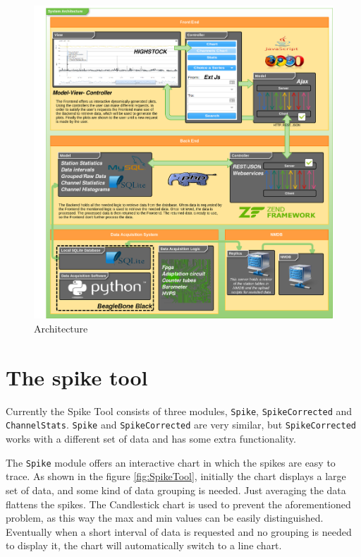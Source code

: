 \documentclass[a4paper]{jpconf}
\begin{document}
\begin{figure}[h]
    \centering
    \includegraphics[keepaspectratio, width=1\textwidth]{./resources/Architecture.png}
    \caption{Architecture}
    \label{fig:arch}
\end{figure}

\section{The spike tool}

Currently the Spike Tool consists of three modules, \texttt{Spike},
\texttt{SpikeCorrected} and \texttt{ChannelStats}. \texttt{Spike} and
\texttt{SpikeCorrected} are very similar, but \texttt{SpikeCorrected} works with
a different set of data and has some extra functionality.

The \texttt{Spike} module offers an interactive chart in which the spikes
are easy to trace. As shown in the figure \ref{fig:SpikeTool}, initially the
chart displays a large set of data, and some kind of data grouping is needed.
Just averaging the data flattens the spikes.  The Candlestick chart is used to
prevent the aforementioned problem, as this way the max and min values can be
easily distinguished. Eventually when a short interval of data is requested and
no grouping is needed to display it, the chart will automatically switch to a
line chart.
\end{document}
